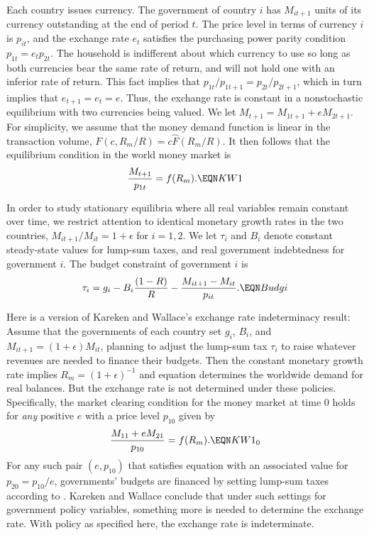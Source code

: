 Each country issues currency. The government
of country $i$ has $M_{it+1}$  units of its currency
outstanding at the end of period $t$.  The price level in
terms of currency $i$ is $p_{it}$, and the exchange rate $e_t$ satisfies
the purchasing power parity condition
$p_{1t} = e_t p_{2t}$.   The household is indifferent
about which currency to use so long as both currencies
bear the same rate of return, and will not hold one with
an inferior rate of return.  This fact implies
that $p_{1t} / p_{1t+1}  =  p_{2t} / p_{2t+1}$, which
in turn implies that $e_{t+1} = e_t = e$.
Thus, the exchange rate is constant in a nonstochastic  equilibrium with
two currencies being valued.  We let
$M_{t+1} = M_{1t+1} + e M_{2t+1}$.
For simplicity, we assume that the money demand function is linear in the
transaction volume, $F(c,R_m/R) = c \hat F(R_m/R)$. It then follows that
the equilibrium condition in the world money market is
 $$ {M_{t+1} \over p_{1t}}  = f(R_m).    \EQN KW1  $$


In order to study stationary equilibria where all real variables remain
constant over time, we restrict attention to
identical monetary growth rates in the
two countries, $M_{it+1}/M_{it}=1+\epsilon$ for $i=1,2$.
We let $\tau_i$ and $B_i$ denote constant steady-state values
for lump-sum taxes, and real government
indebtedness for government $i$.
The budget constraint of government $i$ is
$$ \tau_i = g_i -  B_{i}{(1-R)\over R}
   -{M_{it+1} - M_{it} \over p_{it} } .  \EQN Budgi $$




  Here is a version of Kareken and Wallace's exchange rate
indeterminacy result:  Assume
that the governments of each country set $g_i$, $B_i$,
and $M_{it+1}=(1+\epsilon) M_{it}$, planning to adjust the
lump-sum tax $\tau_i$ to raise whatever revenues are needed to finance their
budgets. Then the constant monetary growth rate implies
$R_m = (1+\epsilon)^{-1}$ and equation  determines
the worldwide demand for real balances. But the exchange rate is not
determined under these policies. Specifically, the market clearing
condition for the money market at time 0 holds for {\it any} positive
$e$ with a price level $p_{10}$ given by
 $$ { M_{11} + e M_{21} \over p_{10}}  = f(R_m).    \EQN KW1_0  $$
For any such pair $(e, p_{10})$ that satisfies equation  with
an associated value for $p_{20}=p_{10}/e$,
governments' budgets are financed by setting lump-sum taxes
according to .   Kareken and Wallace
conclude that under such settings for government
policy variables, something more is needed to determine the exchange
rate.   With policy as specified here, the exchange rate
is indeterminate.




